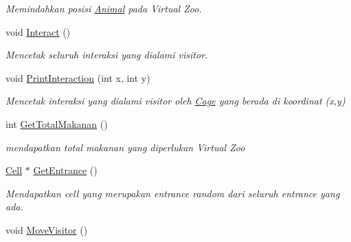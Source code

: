 \begin{DoxyCompactItemize}
\begin{DoxyCompactList}\small\item\em Memindahkan posisi \hyperlink{classAnimal}{Animal} pada Virtual Zoo. \end{DoxyCompactList}\item 
\hypertarget{classVirtualZoo_a65b6734dd5a594201e9c9e538567c70c}{void \hyperlink{classVirtualZoo_a65b6734dd5a594201e9c9e538567c70c}{Interact} ()}\label{classVirtualZoo_a65b6734dd5a594201e9c9e538567c70c}

\begin{DoxyCompactList}\small\item\em Mencetak seluruh interaksi yang dialami visitor. \end{DoxyCompactList}\item 
void \hyperlink{classVirtualZoo_a3740d1909882d68a5eaf6a5b18b34d69}{Print\-Interaction} (int x, int y)
\begin{DoxyCompactList}\small\item\em Mencetak interaksi yang dialami visitor oleh \hyperlink{classCage}{Cage} yang berada di koordinat (x,y) \end{DoxyCompactList}\item 
int \hyperlink{classVirtualZoo_ab67589e1d0dea75807e6f1ce29449df2}{Get\-Total\-Makanan} ()
\begin{DoxyCompactList}\small\item\em mendapatkan total makanan yang diperlukan Virtual Zoo \end{DoxyCompactList}\item 
\hypertarget{classVirtualZoo_a146f6aa831404c252b925c6e11062f6f}{\hyperlink{classCell}{Cell} $\ast$ \hyperlink{classVirtualZoo_a146f6aa831404c252b925c6e11062f6f}{Get\-Entrance} ()}\label{classVirtualZoo_a146f6aa831404c252b925c6e11062f6f}

\begin{DoxyCompactList}\small\item\em Mendapatkan cell yang merupakan entrance random dari seluruh entrance yang ada. \end{DoxyCompactList}\item 
\hypertarget{classVirtualZoo_a192c60430f349e8232e5895e72be15ee}{void \hyperlink{classVirtualZoo_a192c60430f349e8232e5895e72be15ee}{Move\-Visitor} ()}\label{classVirtualZoo_a192c60430f349e8232e5895e72be15ee}


\end{DoxyCompactItemize}
